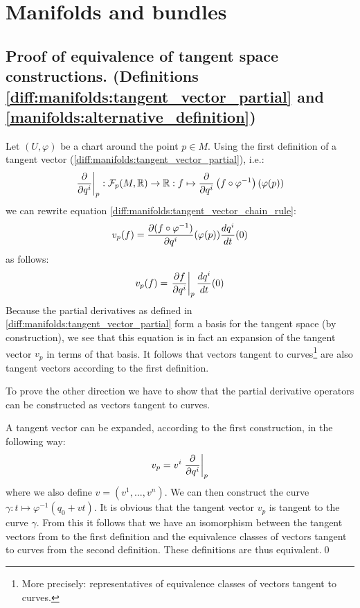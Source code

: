 \section{Manifolds and bundles}
\subsection{Proof of equivalence of tangent space constructions. (Definitions \ref{diff:manifolds:tangent_vector_partial} and \ref{manifolds:alternative_definition})}

	Let $(U, \varphi)$ be a chart around the point $p\in M$. Using the first definition of a tangent vector (\ref{diff:manifolds:tangent_vector_partial}), i.e.:
		\[\left.\displaystyle\frac{\partial }{\partial q^i}\right|_{p}:\mathcal{F}_p(M, \mathbb{R})\rightarrow\mathbb{R}:f\mapsto \frac{\partial }{\partial q^i}\left(f\circ\varphi^{-1}\right)(\varphi(p))\]
	we can rewrite equation \ref{diff:manifolds:tangent_vector_chain_rule}:
		\[v_p(f) = \frac{\partial (f\circ\varphi^{-1})}{\partial q^i}(\varphi(p))\frac{dq^i}{dt}(0)\]
	as follows:
		\[v_p(f) = \left.\frac{\partial f}{\partial q^i}\right|_p\frac{dq^i}{dt}(0)\]
	Because the partial derivatives as defined in \ref{diff:manifolds:tangent_vector_partial} form a basis for the tangent space (by construction), we see that this equation is in fact an expansion of the tangent vector $v_p$ in terms of that basis. It follows that vectors tangent to curves\footnote{More precisely: representatives of equivalence classes of vectors tangent to curves.} are also tangent vectors according to the first definition.

	To prove the other direction we have to show that the partial derivative operators can be constructed as vectors tangent to curves.

	A tangent vector can be expanded, according to the first construction, in the following way:
	\[
		v_p = v^i\left.\frac{\partial }{\partial q^i}\right|_p
	\]
	where we also define $v = (v^1, ..., v^n)$. We can then construct the curve $\gamma: t\mapsto \varphi^{-1}(q_0+vt)$. It is obvious that the tangent vector $v_p$ is tangent to the curve $\gamma$. From this it follows that we have an isomorphism between the tangent vectors from to the first definition and the equivalence classes of vectors tangent to curves from the second definition. These definitions are thus equivalent.\qed
	
